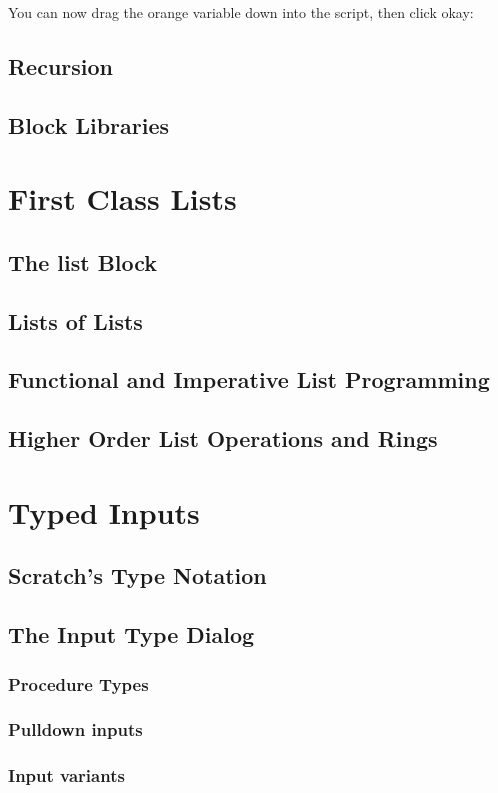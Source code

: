 \documentclass{report}
\begin{document}

You can now drag the orange variable down into the script, then click okay:\nopagebreak


\section{Recursion}
\section{Block Libraries}
\chapter{First Class Lists}
\section{The list Block}
\section{Lists of Lists}
\section{Functional and Imperative List Programming}
\section{Higher Order List Operations and Rings}
\chapter{Typed Inputs}
\section{Scratch's Type Notation}
\section{The \Snap{} Input Type Dialog}
\subsection{Procedure Types}
\subsection{Pulldown inputs}
\subsection{Input variants}
\end{document}
